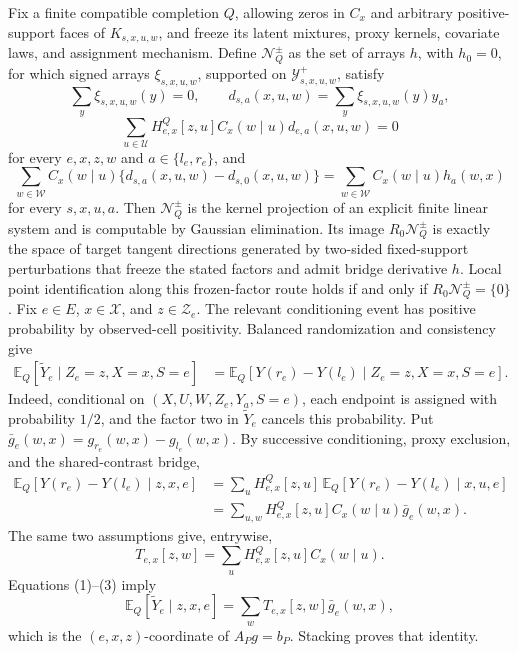 Fix a finite compatible completion \(Q\), allowing zeros in \(C_x\) and arbitrary positive-support faces of \(K_{s,x,u,w}\), and freeze its latent mixtures, proxy kernels, covariate laws, and assignment mechanism.  Define \(\mathcal N_Q^{\pm}\) as the set of arrays \(h\), with \(h_0=0\), for which signed arrays \(\xi_{s,x,u,w}\), supported on \(\mathcal Y^+_{s,x,u,w}\), satisfy
\[
\sum_y\xi_{s,x,u,w}(y)=0,
\qquad
d_{s,a}(x,u,w)=\sum_y\xi_{s,x,u,w}(y)y_a,
\]
\[
\sum_{u\in\mathcal U}H^Q_{e,x}[z,u]C_x(w\mid u)d_{e,a}(x,u,w)=0
\]
for every \(e,x,z,w\) and \(a\in\{l_e,r_e\}\), and
\[
\sum_{w\in\mathcal W}C_x(w\mid u)
\{d_{s,a}(x,u,w)-d_{s,0}(x,u,w)\}
=\sum_{w\in\mathcal W}C_x(w\mid u)h_a(w,x)
\]
for every \(s,x,u,a\).  Then \(\mathcal N_Q^{\pm}\) is the kernel projection of an explicit finite linear system and is computable by Gaussian elimination.  Its image \(R_0\mathcal N_Q^{\pm}\) is exactly the space of target tangent directions generated by two-sided fixed-support perturbations that freeze the stated factors and admit bridge derivative \(h\).  Local point identification along this frozen-factor route holds if and only if \(R_0\mathcal N_Q^{\pm}=\{0\}\).
Fix \(e\in E\), \(x\in\mathcal X\), and \(z\in\mathcal Z_e\).  The relevant conditioning event has positive probability by observed-cell positivity.  Balanced randomization and consistency give
\[
\begin{aligned}
\mathbb E_Q[\widetilde Y_e\mid Z_e=z,X=x,S=e]
&=\mathbb E_Q[Y(r_e)-Y(l_e)\mid Z_e=z,X=x,S=e].
\end{aligned}
\tag{1}
\]
Indeed, conditional on \((X,U,W,Z_e,Y_a,S=e)\), each endpoint is assigned with probability \(1/2\), and the factor two in \(\widetilde Y_e\) cancels this probability.  Put \(\bar g_e(w,x)=g_{r_e}(w,x)-g_{l_e}(w,x)\).  By successive conditioning, proxy exclusion, and the shared-contrast bridge,
\[
\begin{aligned}
\mathbb E_Q[Y(r_e)-Y(l_e)\mid z,x,e]
&=\sum_uH^Q_{e,x}[z,u]\,
  \mathbb E_Q[Y(r_e)-Y(l_e)\mid x,u,e]\\
&=\sum_{u,w}H^Q_{e,x}[z,u]C_x(w\mid u)\bar g_e(w,x).
\end{aligned}
\tag{2}
\]
The same two assumptions give, entrywise,
\[
T_{e,x}[z,w]=\sum_uH^Q_{e,x}[z,u]C_x(w\mid u).
\tag{3}
\]
Equations (1)--(3) imply
\[
\mathbb E_Q[\widetilde Y_e\mid z,x,e]
=\sum_wT_{e,x}[z,w]\bar g_e(w,x),
\]
which is the \((e,x,z)\)-coordinate of \(A_Pg=b_P\).  Stacking proves that identity.


